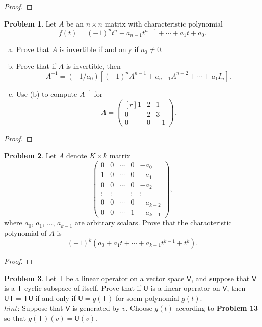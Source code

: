 \documentclass[12pt]{book}
\theoremstyle{definition}
\newtheorem{problem}{Problem}
\begin{document}
	\begin{proof}
	\end{proof}
	\newpage
	\begin{problem}
		Let $A$ be an $n\times n$ matrix with characteristic polynomial $$f(t)=(-1)^nt^n+a_{n-1}t^{n-1}+\cdots+a_1t+a_0.$$
		\begin{enumerate}[(a)]
			\item Prove that $A$ is invertible if and only if $a_0\neq 0$.
			\item Prove that if $A$ is invertible, then $$A^{-1}=(-1/a_0)\left[(-1)^nA^{n-1}+a_{n-1}A^{n-2}+\cdots+a_1 I_n\right].$$
			\item Use (b) to compute $A^{-1}$ for $$A=\begin{pmatrix*}[r]
				1&2&1\\0&2&3\\0&0&-1
			\end{pmatrix*}.$$
		\end{enumerate}
	\end{problem}
	\begin{proof}
	\end{proof}
	\newpage
	\begin{problem}
		Let $A$ denote $K\times k$ matrix
		$$\begin{pmatrix}
			0&0&\cdots&0&-a_0\\
			1&0&\cdots&0&-a_1\\
			0&0&\cdots&0&-a_2\\
			\vdots&\vdots&&\vdots&\vdots\\
			0&0&\cdots&0&-a_{k-2}\\
			0&0&\cdots&1&-a_{k-1}
		\end{pmatrix},$$
		where $a_0$, $a_1$, $\ldots$, $a_{k-1}$ are arbitrary scalars. Prove that the characteristic polynomial of $A$ is
		$$(-1)^k(a_0+a_1t+\cdots +a_{k-1}t^{k-1}+t^k).$$
	\end{problem}
	\begin{proof}
	\end{proof}
	\newpage
	\begin{problem}
		Let $\mathsf{T}$ be a linear operator on a vector space $\mathsf{V}$, and suppose that $\mathsf{V}$ is a $\mathsf{T}$-cyclic subspace of itself. Prove that if $\mathsf{U}$ is a linear operator on $\mathsf{V}$, then $\mathsf{UT}=\mathsf{TU}$ if and only if $\mathsf{U}=g(\mathsf{T})$ for soem polynomial $g(t)$.\\
		$hint$: Suppose that $\mathsf{V}$ is generated by $v$. Choose $g(t)$ according to \textbf{Problem 13} so that $g(\mathsf{T})(v)=\mathsf{U}(v)$.
	\end{problem}
\end{document}
